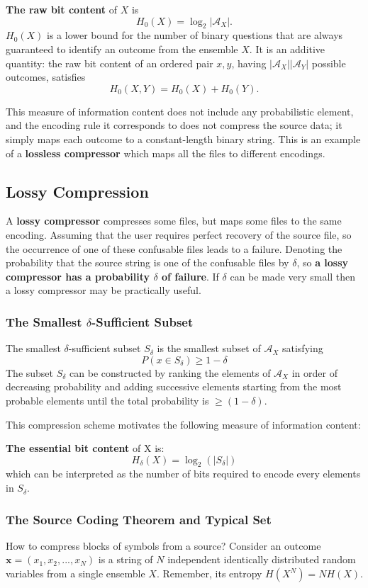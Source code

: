 \documentclass[11pt]{article}
\begin{document}
\textbf{The raw bit content} of $X$ is
\[
  H_0(X) = \log_2 |\mathcal{A}_X|.
\]
$H_0(X)$ is a lower bound for the number of binary questions that are always guaranteed to identify an outcome from the ensemble $X$. It is an additive quantity: the raw bit content of an ordered pair $x,y$, having $|\mathcal{A}_X||\mathcal{A}_Y|$ possible outcomes, satisfies
\[
  H_0(X,Y) = H_0(X) + H_0(Y).
\]

This measure of information content does not include any probabilistic element, and the encoding rule it corresponds to does not compress the source data; it simply maps each outcome to a constant-length binary string. This is an example of a \textbf{lossless compressor} which maps all the files to different encodings.

\subsection{Lossy Compression}
A \textbf{lossy compressor} compresses some files, but maps some files to the same encoding. Assuming that the user requires perfect recovery of the source file, so the occurrence of one of these confusable files leads to a failure. Denoting the probability that the source string is one of the confusable files by $\delta$, so \textbf{a lossy compressor has a probability $\delta$ of failure}. If $\delta$ can be made very small then a lossy compressor may be practically useful.

\subsubsection{The Smallest $\delta$-Sufficient Subset}
The smallest $\delta$-sufficient subset $S_\delta$ is the smallest subset of $\mathcal{A}_X$ satisfying
\[
  P(x \in S_\delta) \geq 1-\delta
\]
The subset $S_\delta$ can be constructed by ranking the elements of $\mathcal{A}_X$ in order of decreasing probability and adding successive elements starting from the most probable elements until the total probability is $\geq (1-\delta)$.

This compression scheme motivates the following measure of information content:

\noindent \textbf{The essential bit content} of X is:
\[
  H_\delta(X) = \log_2(|S_\delta|)
\]
which can be interpreted as the number of bits required to encode every elements in $S_\delta$.

\subsubsection{The Source Coding Theorem and Typical Set}
How to compress blocks of symbols from a source? Consider an outcome $\mathbf{x} = (x_1,x_2,...,x_N)$ is a string of $N$ independent identically distributed random variables from a single ensemble $X$. Remember, its entropy $H(X^N) = NH(X)$.
\end{document}

